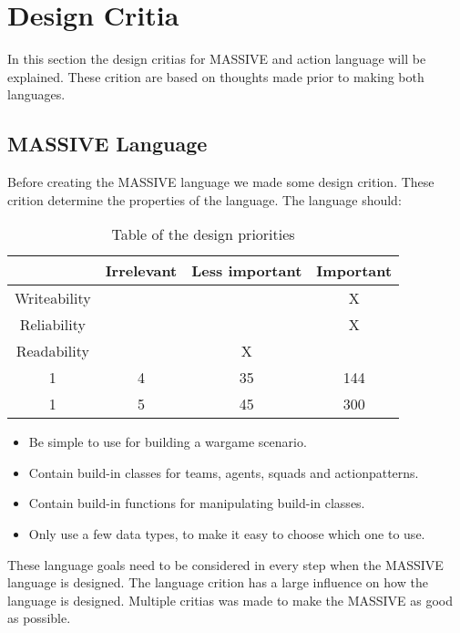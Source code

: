 \section{Design Critia}
\label{sec:designcrit}
In this section the design critias for MASSIVE and action language will be explained. These crition are based on thoughts made prior to making both languages.

\subsection{MASSIVE Language}
Before creating the MASSIVE language we made some design crition. These crition determine the properties of the language. The language should:


\begin{table}[ht] \caption{Table of the design priorities} %
\centering %
\begin{tabular}{cccc} %
\hline\hline %
 & Irrelevant & Less important & Important \\ [0.5ex] %
\hline %
Writeability &  &  & X\\ %
Reliability &  &  & X\\
Readability &  & X & \\
1 & 4 & 35 & 144 \\
1 & 5 & 45 & 300 \\ [1ex] %
\hline %
\end{tabular} 
\label{table:priorities} %
\end{table}


\begin{itemize}
	\item Be simple to use for building a wargame scenario.
	\item Contain build-in classes for teams, agents, squads and actionpatterns.
	\item Contain build-in functions for manipulating build-in classes.
	\item Only use a few data types, to make it easy to choose which one to use.
\end{itemize}

These language goals need to be considered in every step when the MASSIVE language is designed.
The language crition has a large influence on how the language is designed. Multiple critias was made to make the MASSIVE as good as possible.

